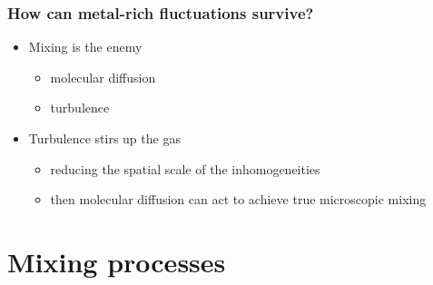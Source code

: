 \documentclass[presentation, compress]{beamer}
\begin{document}
\begin{frame}
\frametitle{How can metal-rich fluctuations survive?}
\label{sec-3-3}


\begin{itemize}
\item Mixing is the enemy
\begin{itemize}
\item molecular diffusion
\item turbulence
\end{itemize}
\item Turbulence stirs up the gas
\begin{itemize}
\item reducing the spatial scale of the inhomogeneities
\item then molecular diffusion can act to achieve true microscopic mixing
\end{itemize}
\end{itemize}
\end{frame}


\section{Mixing processes}
\end{document}

